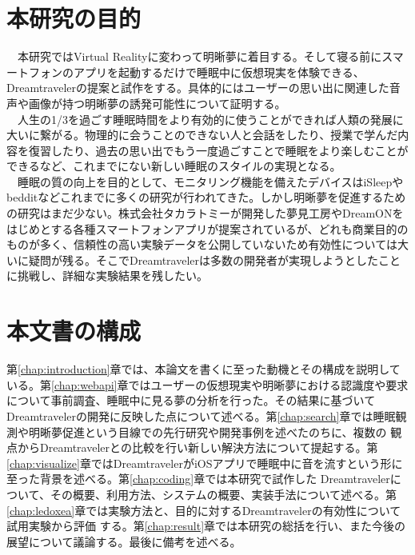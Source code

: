 \section{本研究の目的}
　本研究ではVirtual Realityに変わって明晰夢に着目する。そして寝る前にスマートフォンのアプリを起動するだけで睡眠中に仮想現実を体験できる、Dreamtravelerの提案と試作をする。具体的にはユーザーの思い出に関連した音声や画像が持つ明晰夢の誘発可能性について証明する。\\
　人生の1/3を過ごす睡眠時間をより有効的に使うことができれば人類の発展に大いに繋がる。物理的に会うことのできない人と会話をしたり、授業で学んだ内容を復習したり、過去の思い出でもう一度過ごすことで睡眠をより楽しむことができるなど、これまでにない新しい睡眠のスタイルの実現となる。\\
　睡眠の質の向上を目的として、モニタリング機能を備えたデバイスはiSleep\cite{iSleep}やbeddit\cite{beddit}などこれまでに多くの研究が行われてきた。しかし明晰夢を促進するための研究はまだ少ない。株式会社タカラトミーが開発した夢見工房\cite{takaratomi}やDreamON\cite{dreamOn}をはじめとする各種スマートフォンアプリが提案されているが、どれも商業目的のものが多く、信頼性の高い実験データを公開していないため有効性については大いに疑問が残る。そこでDreamtravelerは多数の開発者が実現しようとしたことに挑戦し、詳細な実験結果を残したい。

\section{本文書の構成}
第\ref{chap:introduction}章では、本論文を書くに至った動機とその構成を説明している。第\ref{chap:webapi}章ではユーザーの仮想現実や明晰夢における認識度や要求について事前調査、睡眠中に見る夢の分析を行った。その結果に基づいてDreamtravelerの開発に反映した点について述べる。第\ref{chap:search}章では睡眠観測や明晰夢促進という目線での先行研究や開発事例を述べたのちに、複数の 観点からDreamtravelerとの比較を行い新しい解決方法について提起する。第\ref{chap:visualize}章ではDreamtravelerがiOSアプリで睡眠中に音を流すという形に至った背景を述べる。第\ref{chap:coding}章では本研究で試作した Dreamtravelerについて、その概要、利用方法、システムの概要、実装手法について述べる。第\ref{chap:ledoxea}章では実験方法と、目的に対するDreamtravelerの有効性について試用実験から評価 する。第\ref{chap:result}章では本研究の総括を行い、また今後の展望について議論する。最後に備考を述べる。
